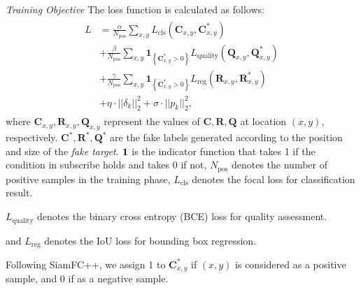 \documentclass[journal]{IEEEtran}
\begin{document}
\textit{Training Objective} The loss function is calculated as follows:
\begin{equation}
\begin{array}{l}
\begin{aligned}
L&=\frac{\alpha}{N_{\mathrm{pos}}} \sum_{x, y} L_{\mathrm{cls}}\left(\textbf{C}_{x, y}, \textbf{C}_{x, y}^{*}\right) \\
&+\frac{\beta}{N_{\mathrm{pos}}} \sum_{x, y} \textbf{1}_{\left\{\textbf{C}_{x, y}^{*}>0\right\}} L_{\mathrm{quality}}\left(\textbf{Q}_{x, y}, \textbf{Q}_{x, y}^{*}\right) \\
&+\frac{\gamma}{N_{\mathrm{pos}}} \sum_{x, y} \textbf{1}_{\left\{\textbf{C}_{x, y}^{*}>0\right\}} L_{\mathrm{reg}}\left(\textbf{R}_{x, y}, \textbf{R}_{x, y}^{*}\right) \\
&+\eta \cdot ||\delta_k||_2^2 +  \sigma \cdot ||p_k||^2_2,
\end{aligned}
\end{array}
\label{eq:loss}
\end{equation}
where $\textbf{C}_{x, y}, \textbf{R}_{x, y}, \textbf{Q}_{x, y}$ represent the values of $\textbf{C}, \textbf{R}, \textbf{Q}$ at location $(x, y)$, respectively. $\textbf{C}^*, \textbf{R}^*, \textbf{Q}^*$ are the fake labels generated according to the position and size of the \textit{fake target}. $\textbf 1$ is the indicator function that takes 1 if the condition in subscribe holds and takes 0 if not, $N_{\mathrm{pos}}$ denotes the number of positive samples in the training phase, $L_{\mathrm{cls}}$ denotes the focal loss \cite{focal} for classification result.

$L_{\mathrm{quality}}$ denotes the binary cross entropy (BCE) loss for quality assessment.

and $L_{\mathrm{reg}}$ denotes the IoU loss \cite{iou-loss} for bounding box regression.

Following SiamFC++, we assign 1 to $\textbf{C}_{x, y}^{*}$ if $(x, y)$ is considered as a positive sample, and 0 if as a negative sample.
  
\end{document}
